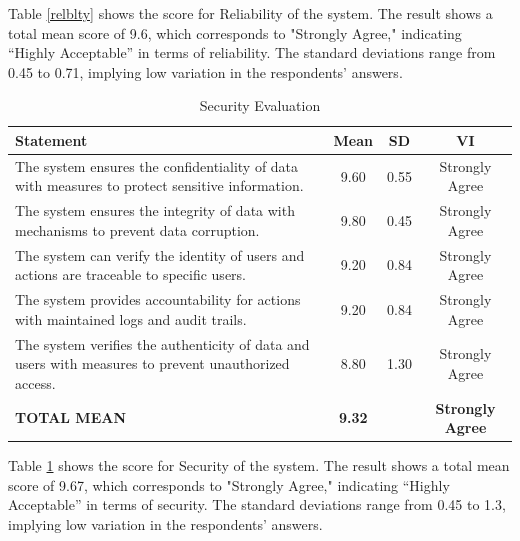 	Table \ref{relblty} shows the score for Reliability of the system. The result shows a total mean score of 9.6, which corresponds to "Strongly Agree," indicating “Highly Acceptable” in terms of reliability. The standard deviations range from 0.45 to 0.71, implying low variation in the respondents’ answers.
	
	\begin{table}[h!]
		\centering
		\caption{Security Evaluation}
		\label{secrty}
		\renewcommand{\arraystretch}{1.2}
		\begin{tabularx}{\linewidth}{|X|c|c|c|}
			\hline
			\textbf{Statement} & \textbf{Mean} & \textbf{SD} & \textbf{VI} \\ \hline
			The system ensures the confidentiality of data with measures to protect sensitive information.
			& 9.60 & 0.55 & Strongly Agree \\ \hline
			The system ensures the integrity of data with mechanisms to prevent data corruption.
			& 9.80 & 0.45 & Strongly Agree \\ \hline
			The system can verify the identity of users and actions are traceable to specific users.
			& 9.20 & 0.84 & Strongly Agree \\ \hline
			The system provides accountability for actions with maintained logs and audit trails.
			& 9.20 & 0.84 & Strongly Agree \\ \hline
			The system verifies the authenticity of data and users with measures to prevent unauthorized access.
			& 8.80 & 1.30 & Strongly Agree \\ \hline
			\textbf{TOTAL MEAN} & \textbf{9.32} & & \textbf{Strongly Agree} \\ \hline
		\end{tabularx}
	\end{table}
	
	Table \ref{secrty} shows the score for Security of the system. The result shows a total mean score of 9.67, which corresponds to "Strongly Agree," indicating “Highly Acceptable” in terms of security. The standard deviations range from 0.45 to 1.3, implying low variation in the respondents’ answers.
	
